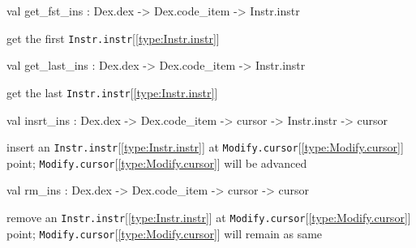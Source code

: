 \documentclass[11pt]{article}
\begin{document}
\label{val:Modify.get-underscorefst-underscoreins}\begin{ocamldoccode}
val get_fst_ins : Dex.dex -> Dex.code_item -> Instr.instr
\end{ocamldoccode}
\begin{ocamldocdescription}
get the first {\tt{Instr.instr}}[\ref{type:Instr.instr}]


\end{ocamldocdescription}




\label{val:Modify.get-underscorelast-underscoreins}\begin{ocamldoccode}
val get_last_ins : Dex.dex -> Dex.code_item -> Instr.instr
\end{ocamldoccode}
\begin{ocamldocdescription}
get the last {\tt{Instr.instr}}[\ref{type:Instr.instr}]


\end{ocamldocdescription}




\label{val:Modify.insrt-underscoreins}\begin{ocamldoccode}
val insrt_ins : Dex.dex -> Dex.code_item -> cursor -> Instr.instr -> cursor
\end{ocamldoccode}
\begin{ocamldocdescription}
insert an {\tt{Instr.instr}}[\ref{type:Instr.instr}] at {\tt{Modify.cursor}}[\ref{type:Modify.cursor}] point; {\tt{Modify.cursor}}[\ref{type:Modify.cursor}] will be advanced


\end{ocamldocdescription}




\label{val:Modify.rm-underscoreins}\begin{ocamldoccode}
val rm_ins : Dex.dex -> Dex.code_item -> cursor -> cursor
\end{ocamldoccode}
\begin{ocamldocdescription}
remove an {\tt{Instr.instr}}[\ref{type:Instr.instr}] at {\tt{Modify.cursor}}[\ref{type:Modify.cursor}] point; {\tt{Modify.cursor}}[\ref{type:Modify.cursor}] will remain as same


\end{ocamldocdescription}
\end{document}
